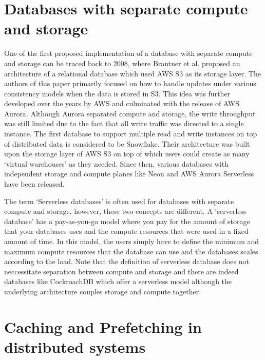 \section{Databases with separate compute and storage}\label{sec:serverlessArch}
One of the first proposed implementation of a database with separate compute and
storage can be traced back to 2008\cite{brantner2008building}, where Brantner et
al. proposed an architecture of a relational database which used AWS S3 as its
storage layer. The authors of this paper primarily focused on how to handle
updates under various consistency models when the data is stored in S3. This
idea was further developed over the years by AWS and culminated with the release
of AWS Aurora\cite{verbitski2017amazon}. Although Aurora separated compute and
storage, the write throughput was still limited due to the fact that all write
traffic was directed to a single instance. The first database to support
multiple read and write instances on top of distributed data is considered to be
Snowflake\cite{dageville2016snowflake}. Their architecture was built upon the
storage layer of AWS S3 on top of which users could create as many `virtual
warehouses' as they needed. Since then, various databases with independent
storage and compute planes like Neon\cite{neonPostgres} and AWS Aurora
Serverless\cite{auroraServerless} have been released.

\medskip
The term `Serverless databases' is often used for databases with separate
compute and storage, however, these two concepts are different. A `serverless
database' has a pay-as-you-go model where you pay for the amount of storage that
your databases uses and the compute resources that were used in a fixed amount
of time. In this model, the users simply have to define the minimum and maximum
compute resources that the database can use and the databases scales according
to the load. Note that the definition of serverless database does not
neccessitate separation between compute and storage and there are indeed
databases like CockroachDB\cite{taft2020cockroachdb} which offer a serverless
model although the underlying architecture couples storage and compute together.



\section{Caching and Prefetching in distributed systems}\label{sec:cachingDistSys}
